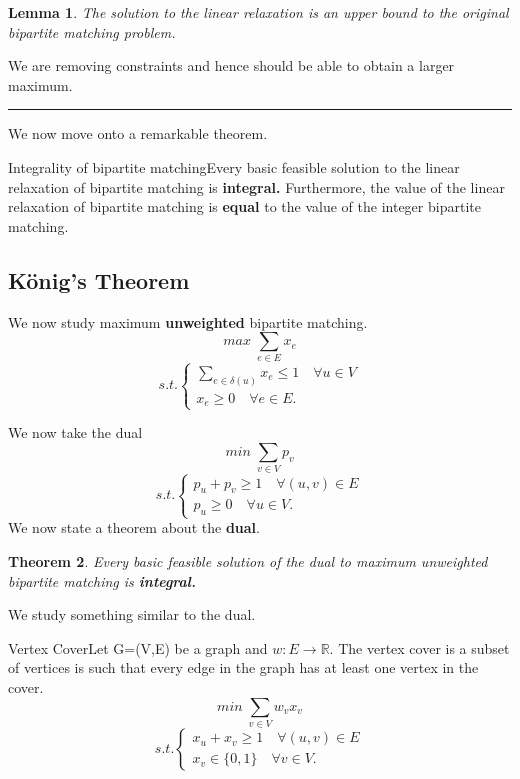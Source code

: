 \documentclass[twoside]{article}
\newcounter{lecnum}
\newtheorem{theorem}{Theorem}[lecnum]
\newtheorem{lemma}[theorem]{Lemma}
\newenvironment{proof}{{\bf Proof:}}{\hfill\rule{2mm}{2mm}}
\begin{document}
\begin{lemma}The solution to the linear relaxation is an upper bound to the original bipartite matching problem.
\end{lemma}
\begin{proof} We are removing constraints and hence should be able to obtain a larger maximum.
\end{proof}

We now move onto a remarkable theorem.

\begin{theorem_exam}{Integrality of bipartite matching}{}Every basic feasible solution to the linear relaxation of bipartite matching is \textbf{integral.} Furthermore, the value of the linear relaxation of bipartite matching is \textbf{equal} to the value of the integer bipartite matching.
\end{theorem_exam}
\subsection{König's Theorem}
We now study maximum \textbf{unweighted} bipartite matching.
$$
max \; \sum_{e \in E}x_e
$$
$$
s.t. 
\begin{cases}
\sum_{e \in \delta(u)}x_e \leq 1 \quad \forall u \in V\\
x_e \geq 0 \quad \forall e \in E.
\end{cases}
$$

We now take the dual 
$$
min \; \sum_{v \in V}p_v
$$
$$
s.t. 
\begin{cases}
p_u + p_v \geq 1 \quad \forall (u,v) \in E\\
p_u \geq 0 \quad \forall u \in V.
\end{cases}
$$
We now state a theorem about the \textbf{dual}.
\begin{theorem}Every basic feasible solution of the dual to maximum unweighted bipartite matching is \textbf{integral.}
\end{theorem}

We study something similar to the dual.
\begin{definition_exam}{Vertex Cover}{}Let G=(V,E) be a graph and $w: E \rightarrow \mathbb{R}.$ The vertex cover is a subset of vertices is such that every edge in the graph has at least one vertex in the cover.
$$
min\; \sum_{v \in V}w_vx_v
$$
$$
s.t. 
\begin{cases}
x_u + x_v \geq 1 \quad \forall (u,v) \in E\\
x_v \in \{0,1\} \quad \forall v \in V.
\end{cases}
$$
\end{definition_exam}
\end{document}
